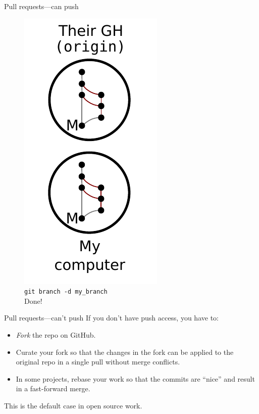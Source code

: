 \begin{frame}{Pull requests---can push}
  \begin{figure}
    \includegraphics{push_014.pdf}
    \\ \texttt{git branch -d my\_branch}
    \\ Done!
  \end{figure}
\end{frame}

\begin{frame}{Pull requests---can't push}
  If you don't have push access, you have to:

  \begin{itemize}
    \item \emph{Fork} the repo on GitHub.
    \item Curate your fork so that the changes in the fork can be
          applied to the original repo in a single pull without
          merge conflicts.
    \item In some projects, rebase your work so that the commits are
          ``nice'' and result in a fast-forward merge.
  \end{itemize}

  This is the default case in open source work.
\end{frame}

